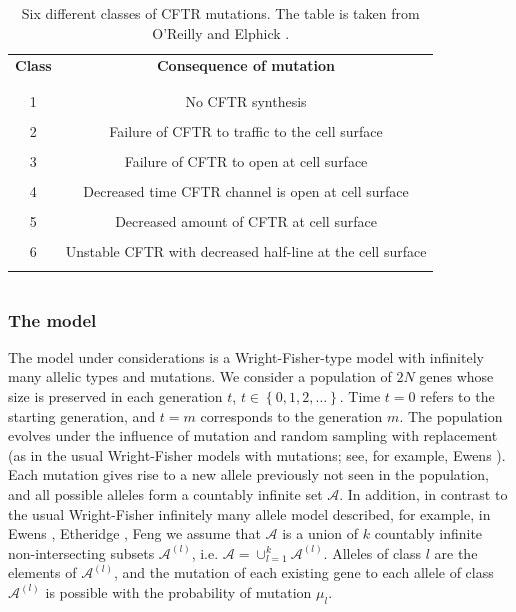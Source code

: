 \documentclass[12pt]{amsart}
\theoremstyle{definition}
\numberwithin{equation}{section}
\begin{document}
\begin{table}
    \centering
    \begin{tabular}{cc}
     \textbf{Class}    &  \textbf{Consequence of mutation}\\
     \\
     \hline
     \\
      1   & No CFTR synthesis \\
      \\
      2   & Failure of CFTR to traffic to the cell surface \\
      \\
      3   &  Failure of CFTR to open at cell surface\\
      \\
      4   &  Decreased time CFTR channel is open at cell surface\\
      \\
      5   &  Decreased amount of CFTR at cell surface\\
      \\
      6   &  Unstable CFTR with decreased half-line at the cell surface\\
      \\
      \hline
    \end{tabular}
    $$
    $$
    \caption{ Six different classes of CFTR mutations. The table is taken from O'Reilly and Elphick \cite{ReillyElphick}.}
    \label{tab1}
\end{table}




\subsubsection{The model}\label{SectionModelDefinition}
The model under considerations is a Wright-Fisher-type model with infinitely many allelic types
and mutations.  We consider a population
of $2N$ genes whose size is preserved in each generation $t$, $t\in\left\{0,1,2,\ldots\right\}$. Time $t=0$ refers to the starting generation,
and $t=m$ corresponds to the generation $m$. The population evolves under the influence
of mutation and random sampling with replacement (as in the usual Wright-Fisher models with mutations; see, for example, Ewens \cite{EwensLectures}). Each mutation gives rise to a new allele previously not seen in the population, and all
possible alleles form a countably infinite set $\mathcal{A}$. In addition, in contrast to the usual Wright-Fisher infinitely many allele model described, for example,
in Ewens \cite{EwensLectures}, Etheridge \cite{Etheridge}, Feng \cite{Feng}
we assume that $\mathcal{A}$ is a union of $k$ countably infinite non-intersecting
subsets $\mathcal{A}^{(l)}$, i.e. $\mathcal{A}=\cup_{l=1}^k\mathcal{A}^{(l)}$.
Alleles of class $l$ are the elements of $\mathcal{A}^{(l)}$, and the mutation of each existing gene to each allele of class $\mathcal{A}^{(l)}$ is possible
with the probability of mutation $\mu_l$.
\end{document}
